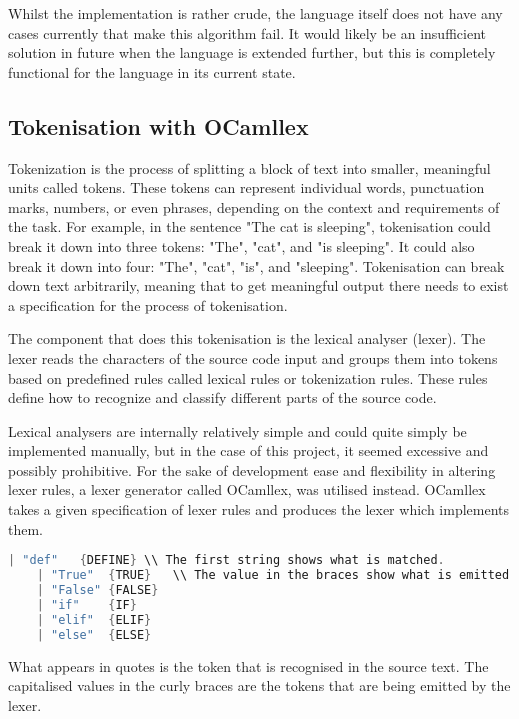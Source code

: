 \documentclass{l4proj}
\begin{document}
Whilst the implementation is rather crude, the language itself does not have any cases currently that make this algorithm fail.
It would likely be an insufficient solution in future when the language is extended further, but this is completely functional for the language in its current state.


\subsection{Tokenisation with OCamllex}

Tokenization is the process of splitting a block of text into smaller, meaningful units called tokens.
These tokens can represent individual words, punctuation marks, numbers, or even phrases, depending on the context and requirements of the task.
For example, in the sentence "The cat is sleeping", tokenisation could break it down into three tokens: "The", "cat", and "is sleeping".
It could also break it down into four: "The", "cat", "is", and "sleeping".
Tokenisation can break down text arbitrarily, meaning that to get meaningful output there needs to exist a specification for the process of tokenisation.

The component that does this tokenisation is the lexical analyser (lexer).
The lexer reads the characters of the source code input and groups them into tokens based on predefined rules called lexical rules or tokenization rules.
These rules define how to recognize and classify different parts of the source code.

Lexical analysers are internally relatively simple and could quite simply be implemented manually, but in the case of this project, it seemed excessive and possibly prohibitive.
For the sake of development ease and flexibility in altering lexer rules, a lexer generator called OCamllex, was utilised instead.
OCamllex takes a given specification of lexer rules and produces the lexer which implements them.


\begin{lstlisting}[language=C, keepspaces=true, caption=A small extract of the PyFunc lexer\, showing the syntax of the lexer specification.]
    | "def"   {DEFINE} \\ The first string shows what is matched.
    | "True"  {TRUE}   \\ The value in the braces show what is emitted.
    | "False" {FALSE}
    | "if"    {IF}
    | "elif"  {ELIF}
    | "else"  {ELSE}
\end{lstlisting}
What appears in quotes is the token that is recognised in the source text.
The capitalised values in the curly braces are the tokens that are being emitted by the lexer.
\end{document}
